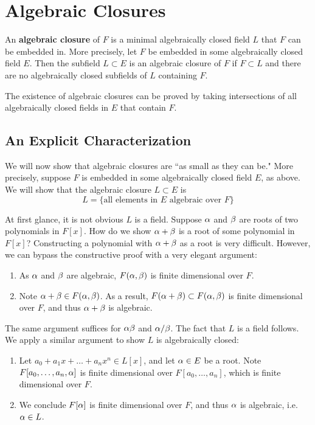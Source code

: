 \section{Algebraic Closures}
An \textbf{algebraic closure} of $F$ is a minimal algebraically closed field $L$ that $F$ can be embedded in. More precisely, let $F$ be embedded in some algebraically closed field $E$. Then the subfield $L \subset E$ is an algebraic closure of $F$ if $F \subset L$ and there are no algebraically closed subfields of $L$ containing $F$.

The existence of algebraic closures can be proved by taking intersections of all algebraically closed fields in $E$ that contain $F$.

\subsection{An Explicit Characterization}
We will now show that algebraic closures are ``as small as they can be." More precisely, suppose $F$ is embedded in some algebraically closed field $E$, as above. We will show that the algebraic closure $L \subset E$ is
\[
    L = \{\text{all elements in $E$ algebraic over $F$}\}
\]

At first glance, it is not obvious $L$ is a field. Suppose $\alpha$ and $\beta$ are roots of two polynomials in $F[x]$. How do we show $\alpha + \beta$ is a root of some polynomial in $F[x]$? Constructing a polynomial with $\alpha + \beta$ as a root is very difficult. However, we can bypass the constructive proof with a very elegant argument:
\begin{enumerate}
    \item As $\alpha$ and $\beta$ are algebraic, $F(\alpha, \beta)$ is finite dimensional over $F$.
    \item Note $\alpha + \beta \in F(\alpha, \beta)$. As a result, $F(\alpha + \beta) \subset F(\alpha, \beta)$ is finite dimensional over $F$, and thus $\alpha + \beta$ is algebraic.
\end{enumerate}
The same argument suffices for $\alpha\beta$ and $\alpha/\beta$. The fact that $L$ is a field follows. We apply a similar argument to show $L$ is algebraically closed:
\begin{enumerate}
    \item Let $a_0 + a_1x + \dots + a_nx^n \in L[x]$, and let $\alpha \in E$ be a root. Note $F[a_0, \dots, a_n, \alpha]$ is finite dimensional over $F[a_0, \dots, a_n]$, which is finite dimensional over $F$.
    \item We conclude $F[\alpha]$ is finite dimensional over $F$, and thus $\alpha$ is algebraic, i.e. $\alpha \in L$.
\end{enumerate}

